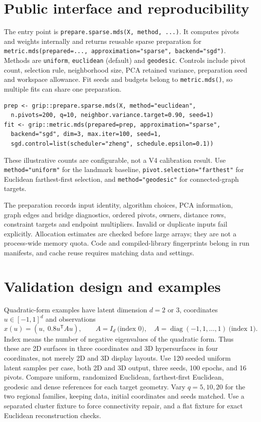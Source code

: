\documentclass[11pt,letterpaper]{article}
\begin{document}
\clearpage\section{Public interface and reproducibility}
The entry point is \texttt{prepare.sparse.mds(X, method, ...)}.
It computes pivots and weights internally and returns reusable sparse preparation
for \texttt{metric.mds(prepared=..., approximation="sparse", backend="sgd")}.
Methods are \texttt{uniform}, \texttt{euclidean} (default) and \texttt{geodesic}.
Controls include pivot count, selection rule, neighborhood size, PCA retained
variance, preparation seed and workspace allowance. Fit seeds and budgets belong
to \texttt{metric.mds()}, so multiple fits can share one preparation.
\begin{verbatim}
prep <- grip::prepare.sparse.mds(X, method="euclidean",
  n.pivots=200, q=10, neighbor.variance.target=0.90, seed=1)
fit <- grip::metric.mds(prepared=prep, approximation="sparse",
  backend="sgd", dim=3, max.iter=100, seed=1,
  sgd.control=list(scheduler="zheng", schedule.epsilon=0.1))
\end{verbatim}
These illustrative counts are configurable, not a V4 calibration result.
Use \texttt{method="uniform"} for the landmark baseline,
\texttt{pivot.selection="farthest"} for Euclidean farthest-first selection,
and \texttt{method="geodesic"} for connected-graph targets.

The preparation records input identity, algorithm choices, PCA information,
graph edges and bridge diagnostics, ordered pivots, owners, distance rows,
constraint targets and endpoint multipliers. Invalid or duplicate inputs fail
explicitly. Allocation estimates are checked before large arrays; they are
not a process-wide memory quota. Code and compiled-library fingerprints belong
in run manifests, and cache reuse requires matching data and settings.

\section{Validation design and examples}
Quadratic-form examples have latent dimension $d=2$ or $3$, coordinates
$u\in[-1,1]^d$ and observations
\[
x(u)=(u,\;0.8u^{\mathsf T}Au),\qquad
 A=I_d\ \text{(index 0)},\quad A=\operatorname{diag}(-1,1,\ldots,1)
 \ \text{(index 1)}.
\]
Index means the number of negative eigenvalues of the quadratic form. Thus
these are 2D surfaces in three coordinates and 3D hypersurfaces in four
coordinates, not merely 2D and 3D display layouts. Use 120 seeded uniform latent
samples per case, both 2D and 3D output, three seeds, 100 epochs, and 16 pivots.
Compare uniform, randomized Euclidean, farthest-first Euclidean, geodesic and
dense references for each target geometry. Vary $q=5,10,20$ for the two regional
families, keeping data, initial coordinates and seeds matched. Use a separated
cluster fixture to force connectivity repair, and a flat fixture for exact
Euclidean reconstruction checks.
\end{document}
